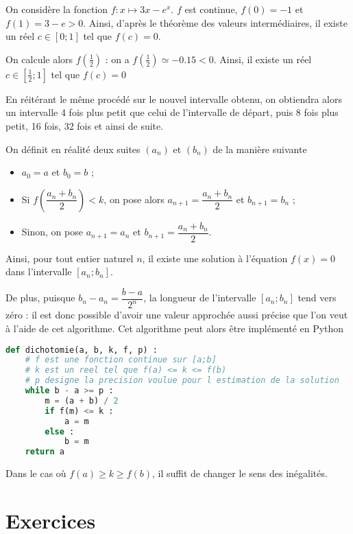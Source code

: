 \documentclass[11pt,fleqn, openany]{book} %
\begin{document}
\begin{example}On considère la fonction $f:x\mapsto 3x-e^x$. $f$ est continue, $f(0)=-1$ et $f(1)=3-e>0$. Ainsi, d'après le théorème des valeurs intermédiaires, il existe un réel $c\in[0;1]$ tel que $f(c)=0$.

On calcule alors $f\left(\frac{1}{2}\right)$ : on a $f\left(\frac{1}{2}\right)\simeq -0.15<0$. Ainsi, il existe un réel $c \in \left[ \frac{1}{2} ; 1 \right]$ tel que $f(c)=0$\end{example}

En réitérant le même procédé sur le nouvel intervalle obtenu, on obtiendra alors un intervalle 4 fois plus petit que celui de l'intervalle de départ, puis 8 fois plus petit, 16 fois, 32 fois et ainsi de suite.

On définit en réalité deux suites $(a_n)$ et $(b_n)$ de la manière suivante
\begin{itemize}
\item $a_0=a$ et $b_0=b$ ;
\item Si $f\left(\dfrac{a_n+b_n}{2}\right) < k$, on pose alors $a_{n+1}=\dfrac{a_n+b_n}{2}$ et $b_{n+1}=b_n$ ;
\item Sinon, on pose $a_{n+1}=a_n$ et $b_{n+1}=\dfrac{a_n+b_n}{2}$.
\end{itemize}

Ainsi, pour tout entier naturel $n$, il existe une solution à l'équation $f(x)=0$ dans l'intervalle $[a_n;b_n]$. 

De plus, puisque $b_n-a_n=\dfrac{b-a}{2^n}$, la longueur de l'intervalle $[a_n;b_n]$ tend vers zéro : il est donc possible d'avoir une valeur approchée aussi précise que l'on veut à l'aide de cet algorithme. Cet algorithme peut alors être implémenté en Python

\begin{lstlisting}[language=python]
def dichotomie(a, b, k, f, p) :
	# f est une fonction continue sur [a;b]
	# k est un reel tel que f(a) <= k <= f(b)
	# p designe la precision voulue pour l estimation de la solution
	while b - a >= p :
		m = (a + b) / 2
		if f(m) <= k :
			a = m
		else :
			b = m
	return a
\end{lstlisting}

Dans le cas où $f(a) \geqslant k \geqslant f(b)$, il suffit de changer le sens des inégalités.



\chapter{Exercices}
\end{document}
